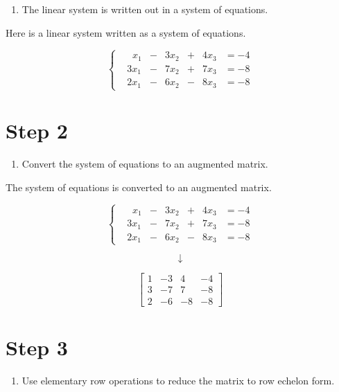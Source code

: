\documentclass[
  letterpaper,
  DIV=11,
  numbers=noendperiod]{scrreprt}
\providecommand{\tightlist}{%
  \setlength{\itemsep}{0pt}\setlength{\parskip}{0pt}}\usepackage{longtable,booktabs,array}
\begin{document}
\begin{enumerate}
\def\labelenumi{\arabic{enumi}.}
\tightlist
\item
  The linear system is written out in a system of equations.
\end{enumerate}

Here is a linear system written as a system of equations.

\[
\begin{cases}
&\;\;x_1 &- &3x_2 &+ &4x_3 &= -4 \\
&3x_1 &- &7x_2 &+ &7x_3 &= -8 \\
&2x_1 &- &6x_2 &- &8x_3 &= -8
\end{cases}
\]

\chapter{Step 2}

\begin{enumerate}
\def\labelenumi{\arabic{enumi}.}
\setcounter{enumi}{1}
\tightlist
\item
  Convert the system of equations to an augmented matrix.
\end{enumerate}

The system of equations is converted to an augmented matrix.

\[
\begin{cases}
&\;\;x_1 &- &3x_2 &+ &4x_3 &= -4 \\
&3x_1 &- &7x_2 &+ &7x_3 &= -8 \\
&2x_1 &- &6x_2 &- &8x_3 &= -8
\end{cases}
\]

\[
\downarrow
\]

\[
\left[\begin{array}{ccc|c}
1 & -3 & 4 & -4 \\
3 & -7 & 7 & -8 \\
2 & -6 & -8 & -8
\end{array}\right]
\]

\chapter{Step 3}

\begin{enumerate}
\def\labelenumi{\arabic{enumi}.}
\setcounter{enumi}{2}
\tightlist
\item
  Use elementary row operations to reduce the matrix to row echelon
  form.
\end{enumerate}
\end{document}
